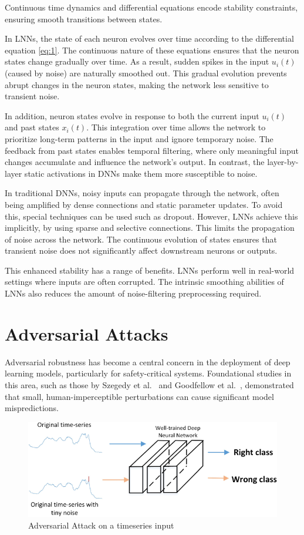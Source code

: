 Continuous time dynamics and differential equations encode stability constraints, ensuring smooth transitions between states.

In LNNs, the state of each neuron evolves over time according to the differential equation \ref{eq:1}. The continuous nature of these equations ensures that the neuron states change gradually over time. As a result, sudden spikes in the input \(u_i(t)\) (caused by noise) are naturally smoothed out. This gradual evolution prevents abrupt changes in the neuron states, making the network less sensitive to transient noise.

In addition, neuron states evolve in response to both the current input \(u_i(t)\) and past states \(x_i(t)\). This integration over time allows the network to prioritize long-term patterns in the input and ignore temporary noise. The feedback from past states enables temporal filtering, where only meaningful input changes accumulate and influence the network’s output. In contrast, the layer-by-layer static activations in DNNs make them more susceptible to noise.

In traditional DNNs, noisy inputs can propagate through the network, often being amplified by dense connections and static parameter updates. To avoid this, special techniques can be used such as dropout. However, LNNs achieve this implicitly, by using sparse and selective connections. This limits the propagation of noise across the network. The continuous evolution of states ensures that transient noise does not significantly affect downstream neurons or outputs.

This enhanced stability has a range of benefits. LNNs perform well in real-world settings where inputs are often corrupted. The intrinsic smoothing abilities of LNNs also reduces the amount of noise-filtering preprocessing required.

\section{Adversarial Attacks}

Adversarial robustness has become a central concern in the deployment of deep learning models, particularly for safety-critical systems. Foundational studies in this area, such as those by Szegedy et al.~\cite{szegedy2013intriguing} and Goodfellow et al.~\cite{goodfellow2014explaining}, demonstrated that small, human-imperceptible perturbations can cause significant model mispredictions.

\begin{figure}[H]
    \centering
    \includegraphics[width=0.7\linewidth]{img/adversarial_attack_overview.png}
    \caption{Adversarial Attack on a timeseries input~\cite{liquidTimeConstant}
\cite{liquidTimeConstant}
    }
    \label{fig:spiking2}
\end{figure}


